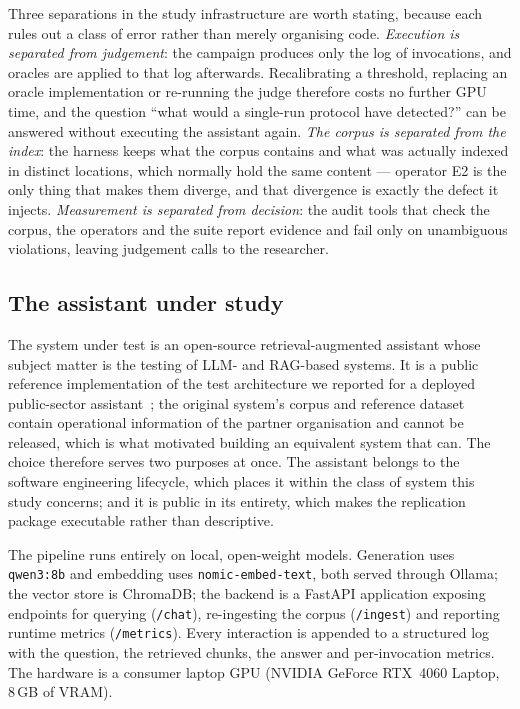 \documentclass[a4paper,fleqn]{cas-dc}
\newcommand{\code}[1]{\texttt{#1}}
\begin{document}
Three separations in the study infrastructure are worth stating, because each
rules out a class of error rather than merely organising code. \emph{Execution
is separated from judgement}: the campaign produces only the log of
invocations, and oracles are applied to that log afterwards. Recalibrating a
threshold, replacing an oracle implementation or re-running the judge therefore
costs no further GPU time, and the question ``what would a single-run protocol
have detected?'' can be answered without executing the assistant again.
\emph{The corpus is separated from the index}: the harness keeps what the
corpus contains and what was actually indexed in distinct locations, which
normally hold the same content --- operator E2 is the only thing that makes
them diverge, and that divergence is exactly the defect it injects.
\emph{Measurement is separated from decision}: the audit tools that check the
corpus, the operators and the suite report evidence and fail only on
unambiguous violations, leaving judgement calls to the researcher.

\subsection{The assistant under study}
\label{sec:sut}

The system under test is an open-source retrieval-augmented assistant whose
subject matter is the testing of LLM- and RAG-based systems. It is a public
reference implementation of the test architecture we reported for a deployed
public-sector assistant~\cite{oliveira2026sast}; the original system's corpus
and reference dataset contain operational information of the partner
organisation and cannot be released, which is what motivated building an
equivalent system that can. The choice therefore serves two purposes at once.
The assistant belongs to the software engineering lifecycle, which places it
within the class of system this study concerns; and it is public in its
entirety, which makes the replication package executable rather than
descriptive.

The pipeline runs entirely on local, open-weight models. Generation uses
\code{qwen3:8b} and embedding uses \code{nomic-embed-text}, both served through
Ollama; the vector store is ChromaDB; the backend is a FastAPI application
exposing endpoints for querying (\code{/chat}), re-ingesting the corpus
(\code{/ingest}) and reporting runtime metrics (\code{/metrics}). Every
interaction is appended to a structured log with the question, the retrieved
chunks, the answer and per-invocation metrics. The hardware is a consumer
laptop GPU (NVIDIA GeForce RTX~4060 Laptop, 8\,GB of VRAM).
\end{document}

